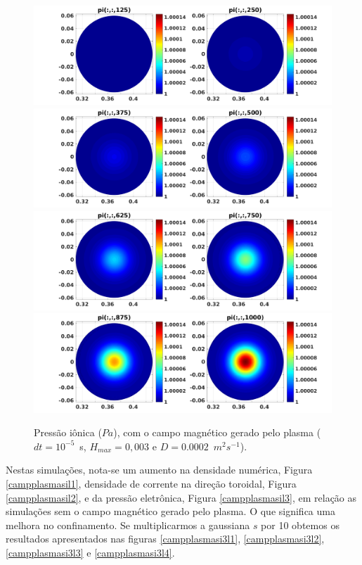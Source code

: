 \documentclass[12pt,oneside,a4paper]{abntex2}
\begin{document}
\begin{figure}[H]
\centering
\includegraphics[scale=0.5]{../SImulacao_breakdown/PDE/pitod1B1.png}  
\includegraphics[scale=0.5]{../SImulacao_breakdown/PDE/pitod2B1.png} 
\includegraphics[scale=0.5]{../SImulacao_breakdown/PDE/pitod3B1.png} 
\includegraphics[scale=0.5]{../SImulacao_breakdown/PDE/pitod4B1.png} 
\caption{Pressão iônica ($Pa$), com o campo magnético gerado pelo plasma ($dt=10^{-5}$\ s, $H_{max} = 0,003$ e $D=0.0002$\ $m^2s^{-1}$).}
\label{campplasmasi2l4}
\end{figure}
\noindent Nestas simulações, nota-se um aumento na densidade numérica, Figura \ref{campplasmasil1}, densidade de corrente na direção toroidal, Figura \ref{campplasmasil2}, e da pressão eletrônica, Figura \ref{campplasmasil3}, em relação as simulações sem o campo magnético gerado pelo plasma. O que significa uma melhora no confinamento. Se multiplicarmos a gaussiana $s$ por 10 obtemos os resultados apresentados nas figuras \ref{campplasmasi3l1}, \ref{campplasmasi3l2}, \ref{campplasmasi3l3} e \ref{campplasmasi3l4}.
\end{document}
